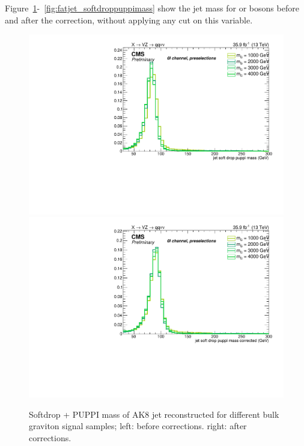 \noindent Figure~\ref{fig:fatjet_pre_softdroppuppimass_ZZ}-~\ref{fig:fatjet_softdroppuppimass} show the jet mass for \W or \Z bosons before and after the correction, without applying any cut on this variable.

\begin{figure}[!htb]
  \begin{center}
    \includegraphics[width=.495\textwidth]{plots/v9/XVZnnPre/FatJet1_softdropPuppiMass_signalZZ.pdf}
    \includegraphics[width=.495\textwidth]{plots/v9/XVZnnPre/FatJet1_softdropPuppiMassCorr_signalZZ.pdf}
  \end{center}
  \caption{Softdrop + PUPPI mass of AK8 jet reconstructed for different bulk graviton signal samples; left: before corrections. right: after corrections.}
  \label{fig:fatjet_pre_softdroppuppimass_ZZ}
\end{figure}

